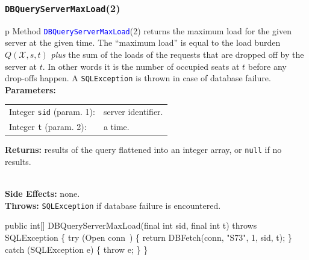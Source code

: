 \documentclass{article}
\def\nwendcode{\endtrivlist \endgroup}      %
\let\nwdocspar=\par
\theoremstyle{definition}                   %
\begin{document}
\subsubsection{{\tt{}\protect{}DBQueryServerMaxLoad}(2)}
\begin{tabular}{p{\textwidth}}
\toprule
{}
Method \textcolor{blue}{{\tt{}\protect{}DBQueryServerMaxLoad}}(2) returns the maximum load
for the given server at the given time. The ``maximum load'' is equal to the
load burden $Q(\mathcal{X},s,t)$ \emph{plus} the sum of the loads of the
requests that are dropped off by the server at $t$. In other words it is the
number of occupied seats at $t$ before any drop-offs happen.
A {\tt{}SQLException} is thrown in case of database failure.\\
\midrule
\textbf{Parameters:} \\
\begin{tabular}{lp{116mm}}
Integer {\tt{}sid} (param. 1):&server identifier.\\
Integer {\tt{}t} (param. 2):&a time.\\
\end{tabular}
\textbf{Returns:} results of the query flattened into an integer array,
or {\tt{}null} if no results.

\\
\textbf{Side Effects:} none.\\
\textbf{Throws:} {\tt{}SQLException} if database failure is encountered.\\
\bottomrule
\end{tabular}
\nwenddocs{}\endmoddef{}
public int[] DBQueryServerMaxLoad(final int sid, final int t) throws SQLException \{
  try (\LA{}Open \code{}conn\edoc{}~{\nwtagstyle{}}\RA{}) \{
    return DBFetch(conn, "S73", 1, sid, t);
  \} catch (SQLException e) \{
    throw e;
  \}
\}
\eatline
{}\nwendcode{}\nwdocspar
\end{document}
